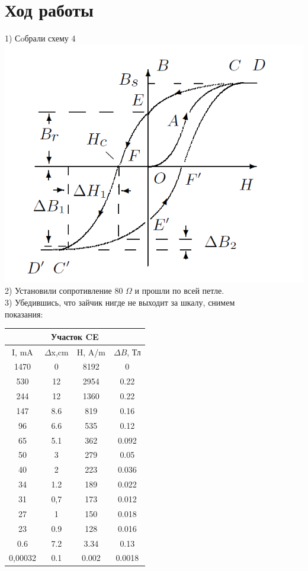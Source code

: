 \documentclass[a4paper,12pt]{article} %
\begin{document}
\section{Ход работы}

1) Сoбрали схему 4 \includegraphics[scale=0.5]{ge} \\
2) Установили сопротивление 80 $\Omega$ и прошли по всей петле.\\
3) Убедившись, что зайчик нигде не выходит за шкалу, снимем\\ показания: \\
\begin{tabular}{|c|c|c|c|}
\hline
\multicolumn{4}{|c|}{Участок CE} \\ 
\hline
I, mA & $\Delta$x,cm & H, A/m & $\Delta B$, Тл \\ 
\hline 
1470 & 0 & 8192 & 0 \\ 
\hline 
530 & 12 & 2954	 &0.22 \\ 
\hline 
244 & 12 & 1360 & 0.22\\ 
\hline 
147 & 8.6 & 819 & 0.16		\\ 
\hline 
96 & 6.6 & 535 & 0.12 \\ 
\hline 
65 & 5.1 & 362 & 0.092 \\ 
\hline 
50 & 3 & 279 & 0.05\\ 
\hline 
40 & 2 & 223 & 0.036\\ 
\hline 
34 & 1.2 & 189 & 0.022 \\ 
\hline 
31 & 0,7 & 173 & 0.012 \\ 
\hline 
27 & 1 & 150 & 0.018 \\ 
\hline 
23 & 0.9 & 128 & 0.016\\ 
\hline 
0.6 & 7.2 & 3.34 & 0.13\\ 
\hline 
0,00032 & 0.1 & 0.002 & 0.0018\\ 
\hline 
\end{tabular} 
\end{document}
